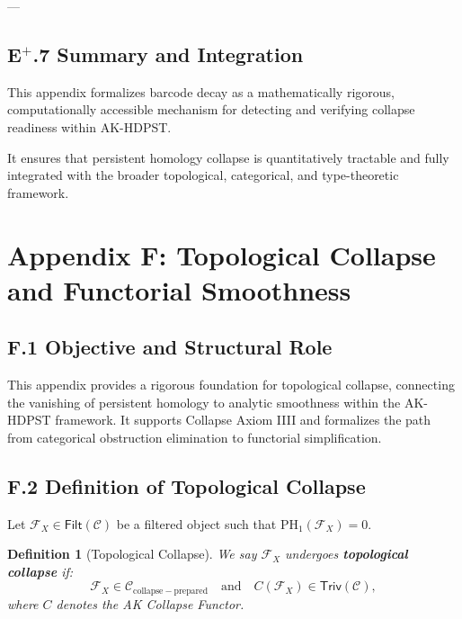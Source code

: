 \documentclass[11pt]{article}
\newtheorem{definition}[theorem]{Definition}
\begin{document}
---

\subsection*{E$^{+}$.7 Summary and Integration}

This appendix formalizes barcode decay as a mathematically rigorous, computationally accessible mechanism for detecting and verifying collapse readiness within AK-HDPST.

It ensures that persistent homology collapse is quantitatively tractable and fully integrated with the broader topological, categorical, and type-theoretic framework.



\section*{Appendix F: Topological Collapse and Functorial Smoothness}

\subsection*{F.1 Objective and Structural Role}

This appendix provides a rigorous foundation for topological collapse, connecting the vanishing of persistent homology to analytic smoothness within the AK-HDPST framework. It supports Collapse Axiom IIII and formalizes the path from categorical obstruction elimination to functorial simplification.

\subsection*{F.2 Definition of Topological Collapse}

Let \( \mathcal{F}_X \in \mathsf{Filt}(\mathcal{C}) \) be a filtered object such that \( \mathrm{PH}_1(\mathcal{F}_X) = 0 \).

\begin{definition}[Topological Collapse]
We say \( \mathcal{F}_X \) undergoes \textbf{topological collapse} if:
\[
\mathcal{F}_X \in \mathcal{C}_{\mathrm{collapse-prepared}} \quad \text{and} \quad C(\mathcal{F}_X) \in \mathsf{Triv}(\mathcal{C}),
\]
where \( C \) denotes the AK Collapse Functor.
\end{definition}
\end{document}
